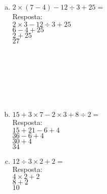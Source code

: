 \documentclass[a4paper,14pt]{article}
\begin{document}
\begin{multicols}{2}
\begin{enumerate}
\begin{enumerate}[a)]
				
				\item $2 \times (7 - 4) - 12 \div 3 + 25 = $ \\
				
				Resposta: \\
				
				$2 \times 3 - 12 \div 3 + 25$\\
				$6 - 4 + 25$\\
				$2 + 25$\\
				$27$\\\\\\\\\\\\\\
				
				\item $15 + 3 \times 7 - 2 \times 3 + 8 \div 2 =$  \\
				
				Resposta: \\
				
				$15 + 21 - 6 + 4$\\
				$36 - 6 + 4$\\
				$30 + 4$\\
				$34$\\
				
				\newpage
				
				\item $12 \div 3 \times 2 + 2 = $ \\
				
				Resposta: \\
				
				$4 \times 2 + 2$ \\
				$8 + 2$ \\
				$10$ \\\\\\\\\\\\\\\\\\\\\\\\\\\\\\\\

				
				\fontsize{10}{\baselineskip} \selectfont
				

\end{enumerate}
\end{enumerate}
\end{multicols}
\end{document}
